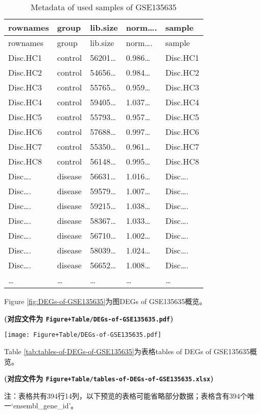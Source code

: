 \documentclass[
]{article}
\begin{document}
\begin{longtable}[]{@{}lllll@{}}
\caption{\label{tab:metadata-of-used-samples-of-GSE135635}Metadata of used samples of GSE135635}\tabularnewline
\toprule
rownames & group & lib.size & norm\ldots. & sample\tabularnewline
\midrule
\endfirsthead
\toprule
rownames & group & lib.size & norm\ldots. & sample\tabularnewline
\midrule
\endhead
Disc.HC1 & control & 56201\ldots{} & 0.986\ldots{} & Disc.HC1\tabularnewline
Disc.HC2 & control & 54656\ldots{} & 0.984\ldots{} & Disc.HC2\tabularnewline
Disc.HC3 & control & 55765\ldots{} & 0.959\ldots{} & Disc.HC3\tabularnewline
Disc.HC4 & control & 59405\ldots{} & 1.037\ldots{} & Disc.HC4\tabularnewline
Disc.HC5 & control & 55793\ldots{} & 0.957\ldots{} & Disc.HC5\tabularnewline
Disc.HC6 & control & 57688\ldots{} & 0.997\ldots{} & Disc.HC6\tabularnewline
Disc.HC7 & control & 55350\ldots{} & 0.961\ldots{} & Disc.HC7\tabularnewline
Disc.HC8 & control & 56148\ldots{} & 0.995\ldots{} & Disc.HC8\tabularnewline
Disc\ldots. & disease & 56631\ldots{} & 1.016\ldots{} & Disc\ldots.\tabularnewline
Disc\ldots. & disease & 59579\ldots{} & 1.007\ldots{} & Disc\ldots.\tabularnewline
Disc\ldots. & disease & 59215\ldots{} & 1.038\ldots{} & Disc\ldots.\tabularnewline
Disc\ldots. & disease & 58367\ldots{} & 1.033\ldots{} & Disc\ldots.\tabularnewline
Disc\ldots. & disease & 56710\ldots{} & 1.002\ldots{} & Disc\ldots.\tabularnewline
Disc\ldots. & disease & 58039\ldots{} & 1.024\ldots{} & Disc\ldots.\tabularnewline
Disc\ldots. & disease & 56652\ldots{} & 1.008\ldots{} & Disc\ldots.\tabularnewline
\ldots{} & \ldots{} & \ldots{} & \ldots{} & \ldots{}\tabularnewline
\bottomrule
\end{longtable}

Figure \ref{fig:DEGs-of-GSE135635}为图DEGs of GSE135635概览。

\textbf{(对应文件为 \texttt{Figure+Table/DEGs-of-GSE135635.pdf})}

\def\@captype{figure}
\begin{center}
\texttt{[image: Figure+Table/DEGs-of-GSE135635.pdf]}
\caption{DEGs of GSE135635}\label{fig:DEGs-of-GSE135635}
\end{center}

Table \ref{tab:tables-of-DEGs-of-GSE135635}为表格tables of DEGs of GSE135635概览。

\textbf{(对应文件为 \texttt{Figure+Table/tables-of-DEGs-of-GSE135635.xlsx})}

\begin{center}\begin{tcolorbox}[colback=gray!10, colframe=gray!50, width=0.9\linewidth, arc=1mm, boxrule=0.5pt]注：表格共有394行14列，以下预览的表格可能省略部分数据；表格含有394个唯一`ensembl\_gene\_id'。
\end{tcolorbox}
\end{center}
\end{document}
